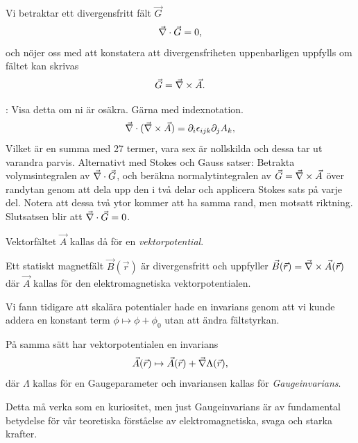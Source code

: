 \documentclass[%
oneside,                 %
final,                   %
10pt]{article}
\newcommand{\longinlinecomment}[3]{{\color{red}{\bf #1}: #2}}
\newenvironment{notice_mdfboxadmon}[1][]{
\begin{notice_mdfboxmdframed}[frametitle=#1]
}
{
\end{notice_mdfboxmdframed}
}
\newenvironment{warning_mdfboxadmon}[1][]{
\begin{warning_mdfboxmdframed}[frametitle=#1]
}
{
\end{warning_mdfboxmdframed}
}
\begin{document}
Vi betraktar ett divergensfritt fält $\vec{G}$
$$
\vec{\nabla} \cdot \vec{G} = 0,
$$
och nöjer oss med att konstatera att divergensfriheten uppenbarligen uppfylls om fältet kan skrivas
\begin{equation}
\vec{G} = \vec{\nabla} \times \vec{A}.
\end{equation}

\longinlinecomment{Kommentar 2}{ Visa detta om ni är osäkra.   Gärna med indexnotation. $$ \vec{\nabla} \cdot (\vec{\nabla} \times \vec{A}) = \partial_i \epsilon_{ijk} \partial_j A_k, $$ Vilket är en summa med 27 termer, vara sex är nollskilda och dessa tar ut varandra parvis.  Alternativt med Stokes och Gauss satser: Betrakta volymsintegralen av $\vec{\nabla} \cdot \vec{G}$, och beräkna normalytintegralen av $\vec{G} = \vec{\nabla} \times \vec{A}$ över randytan genom att dela upp den i två delar och applicera Stokes sats på varje del. Notera att dessa två ytor kommer att ha samma rand, men motsatt riktning. Slutsatsen blir att $\vec{\nabla} \cdot \vec{G} = 0$. }{ Visa detta om ni }

Vektorfältet $\vec{A}$ kallas då för en \emph{vektorpotential}.


\begin{notice_mdfboxadmon}

Ett statiskt magnetfält $\vec{B}(\vec{r})$ är divergensfritt och uppfyller $\vec{B}(\vec{r}) = \vec{\nabla} \times \vec{A}(\vec{r})$ där $\vec{A}$ kallas för den elektromagnetiska vektorpotentialen.
\end{notice_mdfboxadmon} %



Vi fann tidigare att skalära potentialer hade en invarians genom att vi kunde addera en konstant term $\phi \mapsto \phi + \phi_0$ utan att ändra fältstyrkan.

På samma sätt har vektorpotentialen en invarians
\begin{equation}
\vec{A}(\vec{r}) \mapsto \vec{A}(\vec{r}) + \vec{\nabla} \Lambda(\vec{r}),
\end{equation}
där $\Lambda$ kallas för en Gaugeparameter och invariansen kallas för \emph{Gaugeinvarians}. 


\begin{warning_mdfboxadmon}[Kommentar]
Detta må verka som en kuriositet, men just Gaugeinvarians är av fundamental betydelse för vår teoretiska förståelse av elektromagnetiska, svaga och starka krafter.
\end{warning_mdfboxadmon} %
\end{document}
